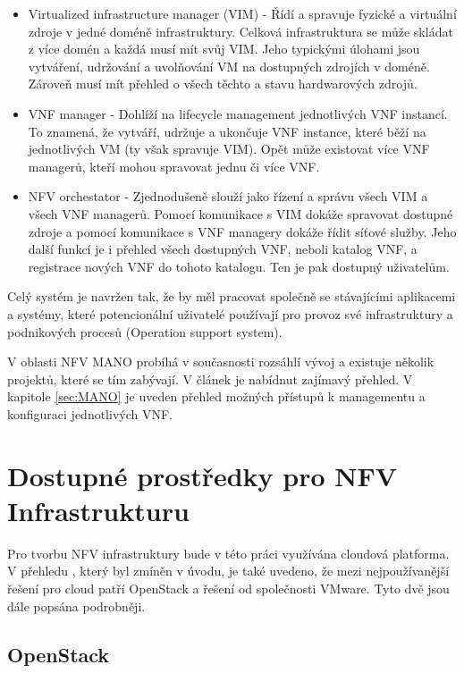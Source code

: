 \begin{itemize}

\item Virtualized infrastructure manager (VIM) - Řídí a spravuje fyzické a virtuální zdroje v jedné doméně infrastruktury. Celková infrastruktura se může skládat z více domén a každá musí mít svůj VIM. Jeho typickými úlohami jsou vytváření, udržování a uvolňování VM na dostupných zdrojích v doméně. Zároveň musí mít přehled o všech těchto a stavu hardwarových zdrojů.

\item VNF manager - Dohlíží na lifecycle management jednotlivých VNF instancí. To znamená, že vytváří, udržuje a ukončuje VNF instance, které běží na jednotlivých VM (ty však spravuje VIM). Opět může existovat více VNF managerů, kteří mohou spravovat jednu či více VNF.

\item NFV orchestator - Zjednodušeně slouží jako řízení a správu všech VIM a všech VNF managerů. Pomocí komunikace s VIM dokáže spravovat dostupné zdroje a pomocí komunikace s VNF managery dokáže řídit síťové služby. Jeho další funkcí je i přehled všech dostupných VNF, neboli katalog VNF, a registrace nových VNF do tohoto katalogu. Ten je pak dostupný uživatelům.
\end{itemize}

Celý systém je navržen tak, že by měl pracovat společně se stávajícími aplikacemi a systémy, které potencionální uživatelé používají pro provoz své infrastruktury a podnikových procesů (Operation support system).

V oblasti NFV MANO probíhá v současnosti rozsáhlí vývoj a existuje několik projektů, které se tím zabývají. V článek \cite{NFV_orchestration} je nabídnut zajímavý přehled. V kapitole \ref{sec:MANO} je uveden přehled možných přístupů k managementu a konfiguraci jednotlivých VNF.

\section{Dostupné prostředky pro NFV Infrastrukturu} \label{sec:NFVI}

Pro tvorbu NFV infrastruktury bude v této práci využívána cloudová platforma. V přehledu \cite{Cloud_adoption} , který byl zmíněn v úvodu, je také uvedeno, že mezi nejpoužívanější řešení pro cloud patří OpenStack a řešení od společnosti VMware. Tyto dvě jsou dále popsána podrobněji.

\subsection{OpenStack}

